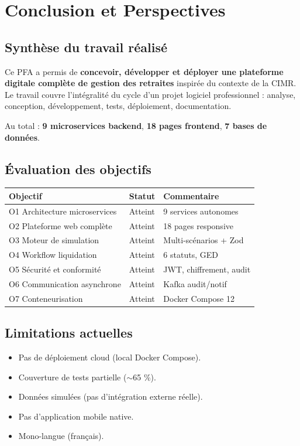 \documentclass[12pt,a4paper,oneside]{report}
\begin{document}
\chapter*{Conclusion et Perspectives}

\section*{Synthèse du travail réalisé}
Ce PFA a permis de \textbf{concevoir, développer et déployer une plateforme digitale complète de gestion des retraites} inspirée du contexte de la CIMR. Le travail couvre l'intégralité du cycle d'un projet logiciel professionnel : analyse, conception, développement, tests, déploiement, documentation.

Au total : \textbf{9 microservices backend}, \textbf{18 pages frontend}, \textbf{7 bases de données}.

\section*{Évaluation des objectifs}
\begin{table}[H]
\centering
\begin{tabular}{lll}
\toprule
\textbf{Objectif} & \textbf{Statut} & \textbf{Commentaire} \\
\midrule
O1 Architecture microservices & Atteint & 9 services autonomes \\
O2 Plateforme web complète & Atteint & 18 pages responsive \\
O3 Moteur de simulation & Atteint & Multi-scénarios + Zod \\
O4 Workflow liquidation & Atteint & 6 statuts, GED \\
O5 Sécurité et conformité & Atteint & JWT, chiffrement, audit \\
O6 Communication asynchrone & Atteint & Kafka audit/notif \\
O7 Conteneurisation & Atteint & Docker Compose 12 \\
\bottomrule
\end{tabular}
\end{table}

\section*{Limitations actuelles}
\begin{itemize}
    \item Pas de déploiement cloud (local Docker Compose).
    \item Couverture de tests partielle ($\sim$65 \%).
    \item Données simulées (pas d'intégration externe réelle).
    \item Pas d'application mobile native.
    \item Mono-langue (français).
\end{itemize}
\end{document}

